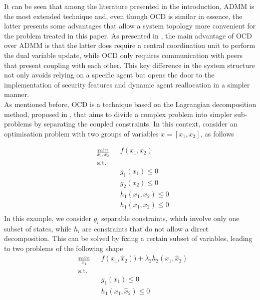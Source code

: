 \documentclass[letterpaper, 10 pt, conference]{ieeeconf}  %
\begin{document}
It can be seen that among the literature presented in the introduction, ADMM is the most extended technique and, even though OCD is similar in essence, the latter presents some advantages that allow a system topology more convenient for the problem treated in this paper. As presented in \cite{Segovia2021}, the main advantage of OCD over ADMM is that the latter does require a central coordination unit to perform the dual variable update, while OCD only requires communication with peers that present coupling with each other. This key difference in the system structure not only avoids relying on a specific agent but opens the door to the implementation of security features and dynamic agent reallocation in a simpler manner. \\


As mentioned before, OCD is a technique based on the Lagrangian decomposition method, proposed in  \cite{conejo2006decomposition}, that aims to divide a complex problem into simpler sub-problems by separating the coupled constraints. In this context, consider an optimisation problem with two groups of variables $x = [x_1, x_2]$, as follows

\begin{equation}
\label{eq:OCD example}
\begin{aligned}
    & \underset{x_1,x_2}{\text{min}} &&f(x_1,x_2) \\
    & \text{s.t.}\\
    & && g_1(x_1)  \leq 0  \\
    & && g_2(x_2)  \leq 0 \\
    & && h_1(x_1,x_2)  \leq 0  \\
    & && h_1(x_1,x_2)  \leq 0 \\
\end{aligned}
\end{equation}
In this example, we consider $g_i$ separable constraints, which involve only one subset of states, while $h_i$ are constraints that do not allow a direct decomposition. This can be solved by fixing a certain subset of variables, leading to two problems of the following shape 
\begin{equation}
\label{eq:OCD Dexample}
\begin{aligned}
    & \underset{x_1}{\text{min}} &&f(x_1,\hat{x}_2)) + {\lambda_2} h_2(x_1,\hat{x}_2)\\
    & \text{s.t.}\\
    & && g_1(x_1)  \leq 0  \\
    & && h_1(x_1,\hat{x}_2)  \leq 0 \\
\end{aligned}
\end{equation}
\end{document}
